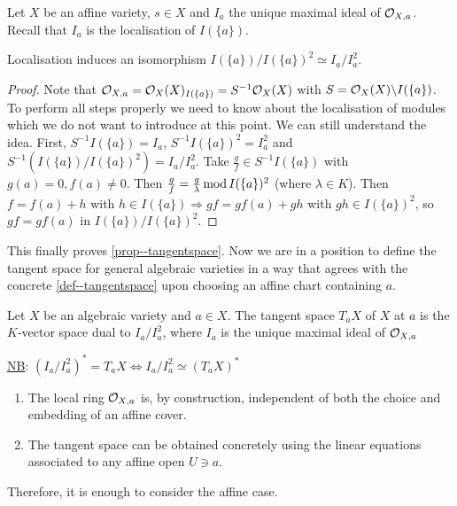 \documentclass[a4paper,11pt]{article}
\begin{document}
				Let $X$ be an affine variety, $s\in X$ and $I_a$ the unique maximal ideal of $\mathcal{O}_{X,a}$. Recall that $I_a$ is the localisation of $I(\{a\})$.

				\begin{prop}
					Localisation induces an isomorphism $I(\{a\})/I(\{a\})^2\simeq I_a/I_a^2$.
				\end{prop}
				\begin{proof}
					Note that $\mathcal{O}_{X,a}=\mathcal{O}_X(X)_{I(\{a\})}=S^{-1}\mathcal{O}_X(X)$ with $S=\mathcal{O}_X(X)\backslash I(\{a\})$. To perform all steps properly we need to know about the localisation of modules which we do not want to introduce at this point. We can still understand the idea. First, $S^{-1}I(\{a\})=I_a$, $S^{-1}I(\{a\})^2=I_a^2$ and $S^{-1}(I(\{a\})/I(\{a\})^2)=I_a/I_a^2$. Take $\frac{g}{f}\in S^{-1}I(\{a\})$ with $g(a)=0,f(a)\neq 0$. Then $\frac{g}{f}=\frac{g}{\lambda}\operatorname{mod} I(\{a\})^2$ (where $\lambda\in K$). Then $f=f(a)+h$ with $h\in I(\{a\})\Longrightarrow gf=gf(a)+gh$ with $gh\in I(\{a\})^2$, so $gf=gf(a)$ in $I(\{a\})/I(\{a\})^2$.
				\end{proof}

				This finally proves \autoref{prop--tangentspace}. Now we are in a position to define the tangent space for general algebraic varieties in a way that agrees with the concrete \autoref{def--tangentspace} upon choosing an affine chart containing $a$.

				\begin{defi}
					Let $X$ be an algebraic variety and $a\in X$. The tangent space $T_aX$ of $X$ at $a$ is the $K$-vector space dual to $I_a/I_a^2$, where $I_a$ is the unique maximal ideal of $\mathcal{O}_{X,a}$
				\end{defi}

				\noindent\underline{NB}: $(I_a/I_a^2)^\ast=T_aX\Longleftrightarrow I_a/I_a^2\simeq(T_aX)^\ast$

				\begin{remark}
					\begin{enumerate}
						\item The local ring $\mathcal{O}_{X,a}$ is, by construction, independent of both the choice and embedding of an affine cover.
						\item The tangent space can be obtained concretely using the linear equations associated to any affine open $U\ni a$.
					\end{enumerate}
				\end{remark}

				Therefore, it is enough to consider the affine case.
\end{document}
